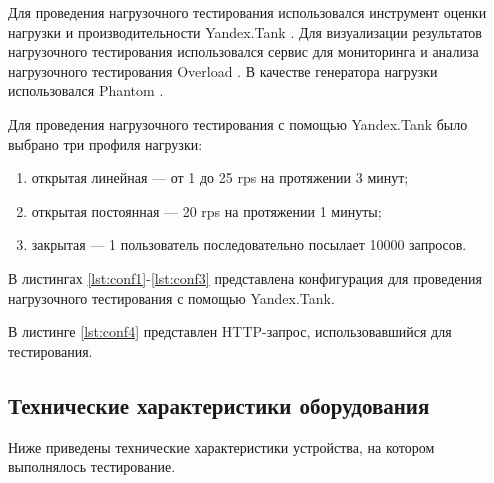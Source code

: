 Для проведения нагрузочного тестирования использовался инструмент оценки нагрузки и производительности Yandex.Tank \cite{yandex_tank}. Для визуализации результатов нагрузочного тестирования использовался сервис для мониторинга и анализа нагрузочного тестирования Overload \cite{overload}. В качестве генератора нагрузки использовался Phantom \cite{phantom}.


Для проведения нагрузочного тестирования с помощью Yandex.Tank было выбрано три профиля нагрузки:

\begin{enumerate}[label*=\arabic*)]
	\item открытая линейная --- от 1 до 25 rps на протяжении 3 минут;
	\item открытая постоянная --- 20 rps на протяжении 1 минуты;
	\item закрытая --- 1 пользователь последовательно посылает 10000 запросов.
\end{enumerate}

В листингах \ref{lst:conf1}-\ref{lst:conf3} представлена конфигурация для проведения нагрузочного тестирования с помощью Yandex.Tank.







В листинге \ref{lst:conf4} представлен HTTP-запрос, использовавшийся для тестирования.





\subsection{Технические характеристики оборудования}

Ниже приведены технические характеристики устройства, на котором выполнялось тестирование.

